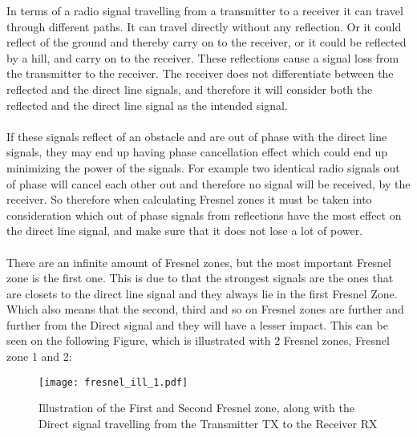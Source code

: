 In terms of a radio signal travelling from a transmitter to a receiver it can travel through different paths. It can travel directly without any reflection. %
Or it could reflect of the ground and thereby carry on to the receiver, or it could be reflected by a hill, and carry on to the receiver. %
These reflections cause a signal loss from the transmitter to the receiver. The receiver does not differentiate between the reflected and the direct line signals, and therefore it will consider both the reflected and the direct line signal as the intended signal. %
\\
\\
If these signals reflect of an obstacle and are out of phase with the direct line signals, they may end up having phase cancellation effect which could end up minimizing the power of the signals. For example two identical radio signals out of phase will cancel each other out and therefore no signal will be received, by the receiver. So therefore when calculating Fresnel zones it must be taken into consideration which out of phase signals from reflections have the most effect on the direct line signal, and make sure that it does not lose a lot of power. 
\\
\\
There are an infinite amount of Fresnel zones, but the most important Fresnel zone is the first one. This is due to that the strongest signals are the ones that are closets to the direct line signal %
and they always lie in the first Fresnel Zone.  
Which also means that the second, third and so on Fresnel zones are further and further from the Direct signal and they will have a lesser impact. This can be seen on the following Figure, which is illustrated with 2 Fresnel zones, Fresnel zone 1 and 2:
\begin{figure}[H]
\centering
\texttt{[image: fresnel\_ill\_1.pdf]}
\caption{Illustration of the First and Second Fresnel zone, along with the Direct signal travelling from the Transmitter TX to the Receiver RX}
\label{dijdk}
\end{figure}

